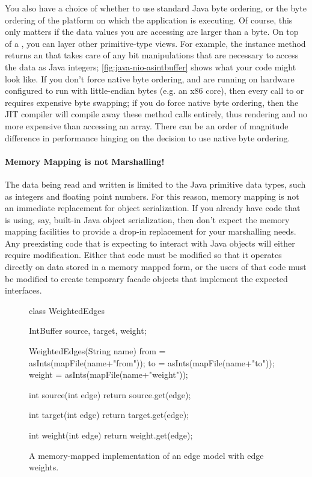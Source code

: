 You also have a choice of whether to use standard Java byte ordering, or the
byte ordering of the platform on which the application is executing. Of course,
this only matters if the data values you are accessing are larger than a byte.
On top of a , you can layer other primitive-type views. For
example, the instance method  returns an
 that takes care of any bit manipulations that are necessary to
access the data as Java integers; \autoref{fig:java-nio-asintbuffer} shows what
your code might look like. If you don't force native byte ordering, and are
running on hardware configured to run with little-endian bytes (e.g. an x86
core), then every call to  or  requires expensive byte
swapping; if you do force native byte ordering, then the JIT compiler will
compile away these method calls entirely, thus rendering  and
 no more expensive than accessing an array. There can be an order
of magnitude difference in performance hinging on the decision to use native
byte ordering.


\paragraph{Memory Mapping is not Marshalling!}
The data being read and written is limited to the Java primitive data types,
such as integers and floating point numbers. For this reason, memory mapping is
not an immediate replacement for object serialization. If you already have code
that is using, say, built-in Java object serialization, then don't expect the
 memory mapping facilities to provide a drop-in replacement for
your marshalling needs. Any preexisting code that is expecting to interact with
Java objects will either require modification. Either that code must be modified
so that it operates directly on data stored in a memory mapped form, or the
users of that code must be modified to create temporary facade objects that
implement the expected interfaces.

\begin{figure}
\centering
\begin{framedlisting}
class WeightedEdges {
 IntBuffer source, target, weight;
  
 WeightedEdges(String name) {
   from = asInts(mapFile(name+"from"));
   to = asInts(mapFile(name+"to"));
   weight = asInts(mapFile(name+"weight"));
 }

 int source(int edge) {
   return source.get(edge);
 }
  
 int target(int edge) {
   return target.get(edge);
 }
  
 int weight(int edge) {
   return weight.get(edge);
 }
}  
\end{framedlisting}
\caption{A memory-mapped implementation of an edge model with edge weights.}
\label{fig:weighted-edges-memory-mapped}
\end{figure}

